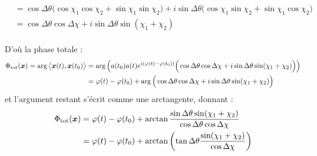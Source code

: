 \begin{annexe}
\begin{demo}
\begin{align*}
		&= \cos\Delta\theta \Big(\cos\chi_1 \cos\chi_2 + \sin\chi_1 \sin\chi_2\Big) + i\sin\Delta\theta \Big( \cos\chi_1 \sin\chi_2 + \sin\chi_1\cos\chi_2\Big) \\
		&= \cos\Delta\theta \cos\Delta\chi + i\sin\Delta\theta \sin(\chi_1+\chi_2)
	\end{align*}
	\\
	D'où la phase totale :
	\begin{align*}
		\Phi_{\text{\normalfont tot}}(\boldsymbol{x}) = \arg\big\langle \boldsymbol{x}(t), \boldsymbol{x}(t_0)\big\rangle &= \arg\left( a(t_0)a(t)e^{i(\varphi(t) - \varphi(t_0))}\Big( \cos\Delta\theta \cos\Delta\chi + i\sin\Delta\theta \sin(\chi_1+\chi_2) \Big) \right) \\
		&= \varphi(t) - \varphi(t_0) + \arg\Big( \cos\Delta\theta \cos\Delta\chi + i\sin\Delta\theta \sin(\chi_1+\chi_2) \Big)
	\end{align*}
	et l'argument restant s'écrit comme une arctangente, donnant :
	\begin{align*}
		\Phi_{\text{\normalfont tot}}(\boldsymbol{x}) &= \varphi(t)-\varphi(t_0) + \arctan\frac{\sin\Delta\theta \sin(\chi_1+\chi_2)}{\cos\Delta\theta \cos\Delta\chi} \\
		&= \varphi(t)-\varphi(t_0) + \arctan \left( \tan\Delta\theta\frac{\sin(\chi_1+\chi_2)}{\cos\Delta\chi} \right)
	\end{align*}
\end{demo}

\end{annexe}